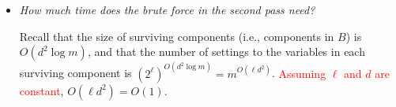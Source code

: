 \documentclass[letterpaper, reqno,11pt]{article}
\begin{document}
\begin{itemize}[itemsep=0pt]
  \begin{proof}
    We generate an independent set by Algorithm \ref{alg:indep}. In each round, the size of $I$ increases by $1$, and the number of vertices in $H$ decreases by $\Delta + 1$. Therefore, the number of rounds is at least $\frac{|H|}{\Delta + 1}$, so the size of the independent set is at least $\frac{|H|}{\Delta + 1}$.

    \begin{algorithm}
      \DontPrintSemicolon
      $I \leftarrow \emptyset$ \\
      \caption{A greedy algorithm that finds an independent set in a subgraph $H$.}
      \label{alg:indep}
    \end{algorithm}
  \end{proof}

  Therefore, we can use $s' = \frac{s}{\Delta + 1}$.
  \item \emph{How much time does the brute force in the second pass need?}
  
  Recall that the size of surviving components (i.e., components in $B$) is $O(d^2 \log m)$, and that the number of settings to the variables in each surviving component is $(2^\ell)^{O(d^2 \log m)} = m^{O(\ell d^2)}$. \textcolor{red}{Assuming $\ell$ and $d$ are constant}, $O(\ell d^2) = O(1)$.
\end{itemize}
\end{document}
